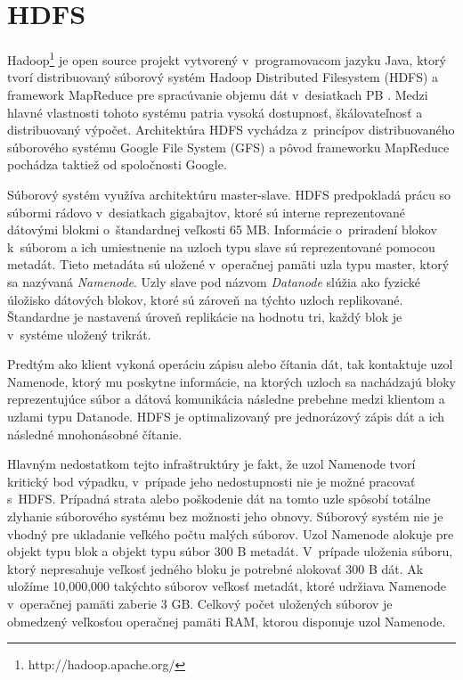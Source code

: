 \documentclass[11pt,twoside,a4paper]{book}
\begin{document}
\section*{HDFS}

Hadoop\footnote{http://hadoop.apache.org/} je open source projekt vytvorený v~programovacom jazyku Java, ktorý tvorí distribuovaný súborový systém Hadoop Distributed Filesystem (HDFS) a framework MapReduce pre spracúvanie objemu dát v~desiatkach PB \cite{Thusoo:2010:DWA:1807167.1807278}. Medzi hlavné vlastnosti tohoto systému patria vysoká dostupnosť, škálovateľnosť a distribuovaný výpočet. Architektúra HDFS vychádza z~princípov distribuovaného súborového systému Google File System (GFS) \cite{Ghemawat:2003:GFS:945445.945450} a pôvod frameworku MapReduce pochádza taktiež od spoločnosti Google.

 


Súborový systém využíva architektúru master-slave. HDFS predpokladá prácu so súbormi rádovo v~desiatkach gigabajtov, ktoré sú interne reprezentované dátovými blokmi o~štandardnej veľkosti 65 MB. Informácie o~priradení blokov k~súborom a ich umiestnenie na uzloch typu slave sú reprezentované pomocou metadát. Tieto metadáta sú uložené v~operačnej pamäti uzla typu master, ktorý sa nazývaná \emph{Namenode}. Uzly slave pod názvom \emph{Datanode} slúžia ako fyzické úložisko dátových blokov, ktoré sú zároveň na týchto uzloch replikované. Štandardne je nastavená úroveň replikácie na hodnotu tri,
každý blok je v~systéme uložený trikrát.

Predtým ako klient vykoná operáciu zápisu alebo čítania dát, tak kontaktuje uzol Namenode, ktorý mu poskytne informácie, na ktorých uzloch sa nachádzajú bloky reprezentujúce súbor a dátová komunikácia následne prebehne medzi klientom a uzlami typu Datanode. HDFS je optimalizovaný pre jednorázový zápis dát a ich následné mnohonásobné čítanie.


Hlavným nedostatkom tejto infraštruktúry je fakt, že uzol Namenode tvorí kritický bod výpadku, v~prípade jeho nedostupnosti nie je možné pracovať s~HDFS. Prípadná strata alebo poškodenie dát na tomto uzle spôsobí totálne zlyhanie súborového systému bez možnosti jeho obnovy. Súborový systém nie je vhodný pre ukladanie veľkého počtu malých súborov.
Uzol Namenode alokuje pre objekt typu blok a objekt typu súbor 300 B metadát. V~prípade uloženia súboru, ktorý nepresahuje veľkosť jedného bloku je potrebné alokovať 300 B dát. Ak uložíme 10,000,000 takýchto súborov veľkosť metadát, ktoré udržiava Namenode v~operačnej pamäti zaberie 3 GB. Celkový počet uložených súborov je obmedzený veľkosťou operačnej pamäti RAM, ktorou disponuje uzol Namenode.
\end{document}
